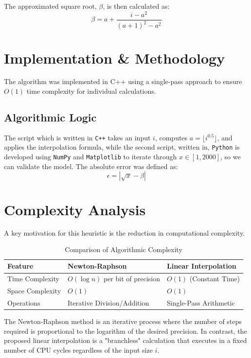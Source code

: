 \documentclass{article}
\begin{document}
The approximated square root, $\beta$, is then calculated as:
\begin{equation}
    \beta = a + \frac{i - a^2}{(a+1)^2 - a^2}
\end{equation}

\section{Implementation \& Methodology}
The algorithm was implemented in C++ using a single-pass approach to ensure $O(1)$ time complexity for individual calculations. 

\subsection{Algorithmic Logic}
The script which is written in \texttt{C++} takes an input $i$, computes $a = \lfloor i^{0.5} \rfloor$, and applies the interpolation formula, while the second script, written in, \texttt{Python} is developed using \texttt{NumPy} and \texttt{Matplotlib} to iterate through $x \in [1, 2000]$, so we can validate the model. The absolute error was defined as:\textbf{}
\begin{equation}
    \epsilon = | \sqrt{x} - \beta |
\end{equation}
\section{Complexity Analysis}
A key motivation for this heuristic is the reduction in computational complexity. 

\begin{table}[h]
\centering
\begin{tabular}{|l|l|l|}
\hline
\textbf{Feature} & \textbf{Newton-Raphson} & \textbf{Linear Interpolation} \\ \hline
Time Complexity  & $O(\log n)$ per bit of precision & $O(1)$ (Constant Time) \\ \hline
Space Complexity & $O(1)$ & $O(1)$ \\ \hline
Operations       & Iterative Division/Addition & Single-Pass Arithmetic \\ \hline
\end{tabular}
\caption{Comparison of Algorithmic Complexity}
\end{table}

The Newton-Raphson method is an iterative process where the number of steps required is proportional to the logarithm of the desired precision. In contrast, the proposed linear interpolation is a "branchless" calculation that executes in a fixed number of CPU cycles regardless of the input size $i$.
\end{document}
